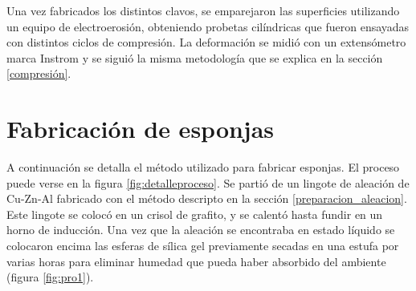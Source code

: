 \documentclass[a4paper,12pt,fleqn,twoside,openany]{book}
\begin{document}
    
    Una vez fabricados los distintos clavos, se emparejaron las superficies utilizando un equipo de electroerosión, obteniendo probetas cilíndricas que fueron ensayadas con distintos ciclos de compresión. La deformación se midió con un extensómetro marca Instrom y se siguió la misma metodología que se explica en la sección \ref{compresión}.
    

\section{Fabricación de esponjas} \label{FabricacionEsponjas}

A continuación se detalla el método utilizado para fabricar esponjas. El proceso puede verse en la figura \ref{fig:detalleproceso}. Se partió de un lingote de aleación de Cu-Zn-Al fabricado con el método descripto en la sección \ref{preparacion_aleacion}. Este lingote se colocó en un crisol de grafito, y se calentó hasta fundir en un horno de inducción. Una vez que la aleación se encontraba en estado líquido se colocaron encima las esferas de sílica gel previamente secadas en una estufa por varias horas para eliminar humedad que pueda haber absorbido del ambiente (figura \ref{fig:pro1}).
\end{document}

